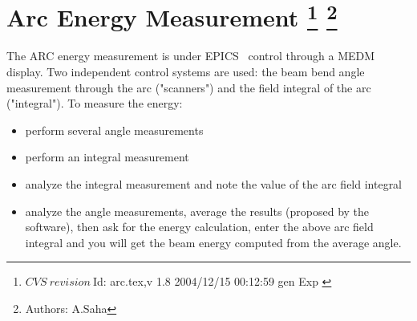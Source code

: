 \chapter[Arc Energy Measurement]{Arc Energy Measurement
\footnote{
  $CVS~revision~ $Id: arc.tex,v 1.8 2004/12/15 00:12:59 gen Exp $ $
}
\footnote{Authors: A.Saha }
}

\providecommand{\LyX}{L\kern-.1667em\lower.25em\hbox{Y}\kern-.125emX\@}

\newenvironment{lyxlist}[1]
  {\begin{list}{}
    {\settowidth{\labelwidth}{#1}
     \setlength{\leftmargin}{\labelwidth}
     \addtolength{\leftmargin}{\labelsep}
     \renewcommand{\makelabel}[1]{##1 \hfill}}}
  {\end{list}}

\newenvironment{lyxcode}
  {\begin{list}{}{
    \setlength{\rightmargin}{\leftmargin}
    \raggedright
    \setlength{\itemsep}{0pt}
    \setlength{\parsep}{0pt}
    \ttfamily}%
   \item[]}
  {\end{list}}

The ARC energy measurement is under EPICS~\cite{EPICSwww} control through 
a MEDM~\cite{MEDMwww} display. Two
independent control systems are used: the beam bend angle measurement through
the arc ("scanners") and the field integral of
the arc ("integral"). To measure the energy: 

\begin{itemize}
\item perform several angle measurements 
\item perform an integral measurement 
\item analyze the integral measurement and note the value of the arc field 
integral 
\item analyze the angle measurements, average the results (proposed by the 
software),
then ask for the energy calculation, enter the above arc field integral and
you will get the beam energy computed from the average angle. 
\end{itemize}


